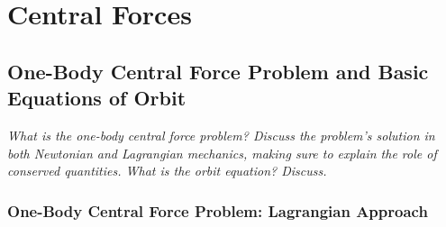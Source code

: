 \documentclass[11pt, a4paper]{article}
\begin{document}
\newpage 

\section{Central Forces}
\subsection{One-Body Central Force Problem and Basic Equations of Orbit}
\textit{What is the one-body central force problem? Discuss the problem's solution in both Newtonian and Lagrangian mechanics, making sure to explain the role of conserved quantities. What is the orbit equation? Discuss.}

\subsubsection{One-Body Central Force Problem: Lagrangian Approach}
\end{document}
